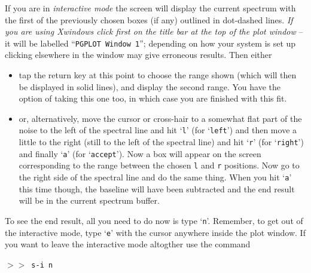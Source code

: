 \documentclass[11pt,twoside]{starlink}
\providecommand{\SP}{{$>\!>$}}
\begin{document}
If you are in \textit{interactive mode} the screen will display the current
spectrum with the first of the previously chosen boxes (if any)
outlined in dot-dashed lines. \textit{If you are using Xwindows click
first on the title bar at the top of the plot window} -- it will be
labelled ``{\tt{PGPLOT Window 1}}''; depending on how your system is
set up clicking elsewhere in the window may give erroneous results.
Then either
\begin{itemize}
\item
tap the return key at this point to choose the range shown (which will
then be displayed in solid lines), and display the second range. You
have the option of taking this one too, in which case you are finished
with this fit.
\item
or, alternatively, move the cursor or cross-hair to a somewhat flat
part of the noise to the left of the spectral line and hit `{\tt{l}}'
(for `{\tt{left}}') and then move a little to the right (still to the
left of the spectral line) and hit `{\tt{r}}' (for `{\tt{right}}') and
finally `{\tt{a}}' (for `{\tt{accept}}').  Now a box will appear on the
screen corresponding to the range between the chosen \texttt{l} and \texttt{r} positions.  Now go to the right side of the spectral line and do
the same thing.  When you hit `{\tt{a}}' this time though, the baseline
will have been subtracted and the end result will be in the current
spectrum buffer.
\end{itemize}
To see the end result, all you need to do now is type `{\tt{n}}'.
Remember, to get out of the interactive mode, type `{\tt{e}}' with the
cursor anywhere inside the plot window. If you want to leave the
interactive mode altogther use the command

\SP\ \verb|s-i n|
\end{document}
